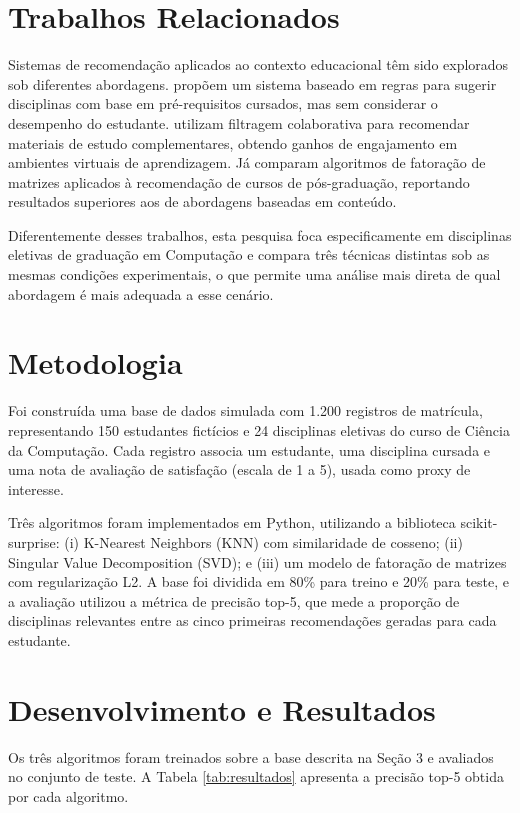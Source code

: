 \documentclass[a4paper,12pt]{article}
\begin{document}
\section{Trabalhos Relacionados}

Sistemas de recomendação aplicados ao contexto educacional têm sido
explorados sob diferentes abordagens. \cite{silva2022} propõem um sistema
baseado em regras para sugerir disciplinas com base em pré-requisitos
cursados, mas sem considerar o desempenho do estudante. \cite{oliveira2021}
utilizam filtragem colaborativa para recomendar materiais de estudo
complementares, obtendo ganhos de engajamento em ambientes virtuais de
aprendizagem. Já \cite{souza2023} comparam algoritmos de fatoração de
matrizes aplicados à recomendação de cursos de pós-graduação, reportando
resultados superiores aos de abordagens baseadas em conteúdo.

Diferentemente desses trabalhos, esta pesquisa foca especificamente em
disciplinas eletivas de graduação em Computação e compara três técnicas
distintas sob as mesmas condições experimentais, o que permite uma
análise mais direta de qual abordagem é mais adequada a esse cenário.

\section{Metodologia}

Foi construída uma base de dados simulada com 1.200 registros de
matrícula, representando 150 estudantes fictícios e 24 disciplinas
eletivas do curso de Ciência da Computação. Cada registro associa um
estudante, uma disciplina cursada e uma nota de avaliação de satisfação
(escala de 1 a 5), usada como proxy de interesse.

Três algoritmos foram implementados em Python, utilizando a biblioteca
scikit-surprise: (i) K-Nearest Neighbors (KNN) com similaridade de
cosseno; (ii) Singular Value Decomposition (SVD); e (iii) um modelo de
fatoração de matrizes com regularização L2. A base foi dividida em 80\%
para treino e 20\% para teste, e a avaliação utilizou a métrica de
precisão top-5, que mede a proporção de disciplinas relevantes entre as
cinco primeiras recomendações geradas para cada estudante.

\section{Desenvolvimento e Resultados}

Os três algoritmos foram treinados sobre a base descrita na Seção 3 e
avaliados no conjunto de teste. A Tabela \ref{tab:resultados} apresenta a
precisão top-5 obtida por cada algoritmo.
\end{document}
